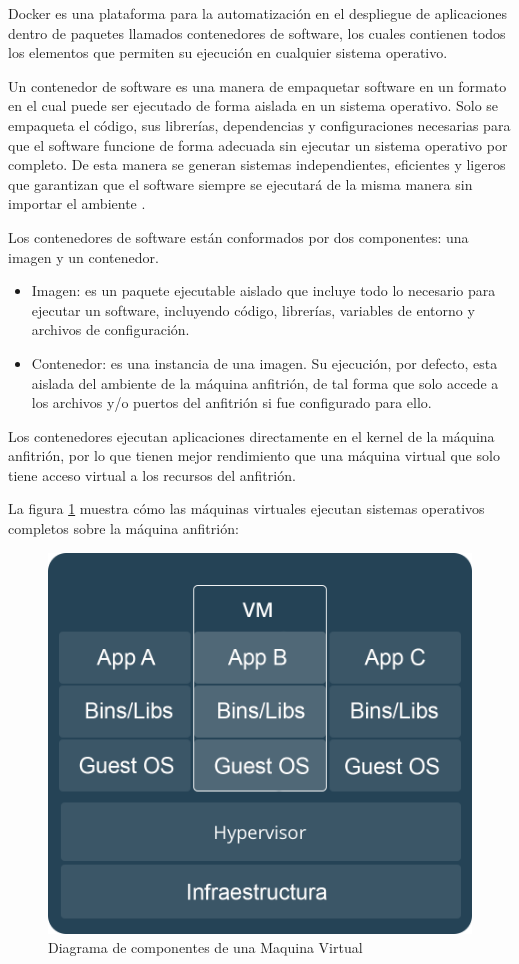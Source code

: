 Docker es una plataforma para la automatización en el despliegue de aplicaciones dentro de paquetes llamados contenedores de software,
los cuales contienen todos los elementos que permiten su ejecución en cualquier sistema operativo.

Un contenedor de software es una manera de empaquetar software en un formato en el cual puede ser ejecutado de forma aislada en un sistema
operativo. Solo se empaqueta el código, sus librerías, dependencias y configuraciones necesarias para que el
software funcione de forma adecuada sin ejecutar un sistema operativo por completo.
De esta manera se generan sistemas independientes, eficientes y ligeros que garantizan
que el software siempre se ejecutará de la misma manera sin importar el ambiente \cite{21}.

Los contenedores de software están conformados por dos componentes: una imagen y un contenedor.

\begin{itemize}
\item Imagen: es un paquete ejecutable aislado que incluye todo lo necesario para ejecutar un software, incluyendo código,
librerías, variables de entorno y archivos de configuración.

\item Contenedor: es una instancia de una imagen. Su ejecución, por defecto, esta aislada del ambiente de la máquina anfitrión,
de tal forma que solo accede a los archivos y/o puertos del anfitrión si fue configurado para ello.
\end{itemize}

Los contenedores ejecutan aplicaciones directamente en el kernel de la máquina anfitrión, por lo que tienen mejor rendimiento que una máquina virtual que solo tiene acceso virtual a los recursos del anfitrión.

La figura \ref{fig:docker_vm} muestra cómo las máquinas virtuales ejecutan sistemas operativos completos sobre la máquina anfitrión:

\begin{figure}[H]
	\centering
		\includegraphics[width=.9\textwidth]{figures/docker_vm}
	\caption{Diagrama de componentes de una Maquina Virtual}
	\label{fig:docker_vm}
\end{figure}

